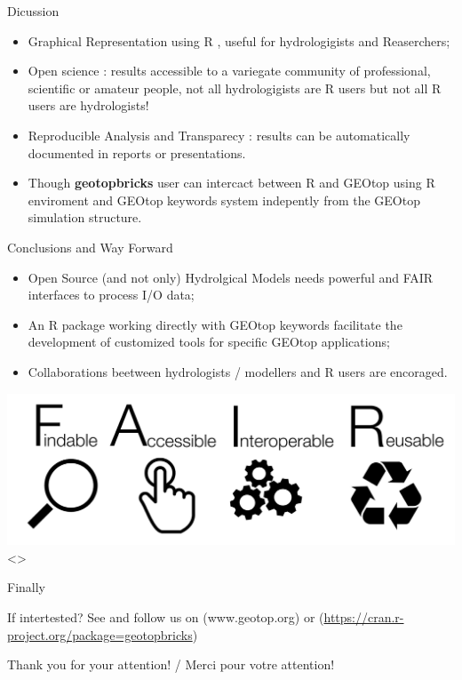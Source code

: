\documentclass[ignorenonframetext,]{beamer}
\providecommand{\tightlist}{%
  \setlength{\itemsep}{0pt}\setlength{\parskip}{0pt}}
\begin{document}
\begin{frame}{Dicussion}

\begin{itemize}
\tightlist
\item
  Graphical Representation using R , useful for hydrologigists and
  Reaserchers;
\item
  Open science : results accessible to a variegate community of
  professional, scientific or amateur people, not all hydrologigists are
  R users but not all R users are hydrologists!
\item
  Reproducible Analysis and Transparecy : results can be automatically
  documented in reports or presentations.
\item
  Though \textbf{geotopbricks} user can intercact between R and GEOtop
  using R enviroment and GEOtop keywords system indepently from the
  GEOtop simulation structure.
\end{itemize}

\end{frame}

\begin{frame}{Conclusions and Way Forward}

\begin{itemize}
\item
  Open Source (and not only) Hydrolgical Models needs powerful and FAIR
  interfaces to process I/O data;
\item
  An R package working directly with GEOtop keywords facilitate the
  development of customized tools for specific GEOtop applications;
\item
  Collaborations beetween hydrologists / modellers and R users are
  encoraged.
\end{itemize}

\includegraphics{resources/images/FAIR_data_principles.jpg}\textless{}\center\textgreater{}

\end{frame}

\begin{frame}{Finally}

If intertested? See and follow us on (www.geotop.org) or
(\url{https://cran.r-project.org/package=geotopbricks})

Thank you for your attention! / Merci pour votre attention!

\end{frame}
\end{document}
